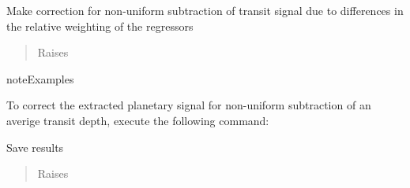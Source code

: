\documentclass[a4paper,10pt,english]{sphinxmanual}
\begin{document}
\begin{fulllineitems}
\begin{fulllineitems}
\end{fulllineitems}


\begin{fulllineitems}
\label{\detokenize{cascade.TSO:cascade.TSO.TSO.TSOSuite.correct_extracted_spectrum}}
Make correction for non-uniform subtraction of transit signal due to
differences in the relative weighting of the regressors
\begin{quote}\begin{description}
\item[{Raises}] \leavevmode
{}

\end{description}\end{quote}

\begin{sphinxadmonition}{note}{Examples}

To correct the extracted planetary signal for non-uniform
subtraction of an averige transit depth, execute the following command:

%
\begin{sphinxVerbatim}[commandchars=\\\{\}]
\end{sphinxVerbatim}
\end{sphinxadmonition}

\end{fulllineitems}


\begin{fulllineitems}
\label{\detokenize{cascade.TSO:cascade.TSO.TSO.TSOSuite.save_results}}
Save results
\begin{quote}\begin{description}
\item[{Raises}] \leavevmode
{}


\end{description}
\end{quote}
\end{fulllineitems}
\end{fulllineitems}
\end{document}
